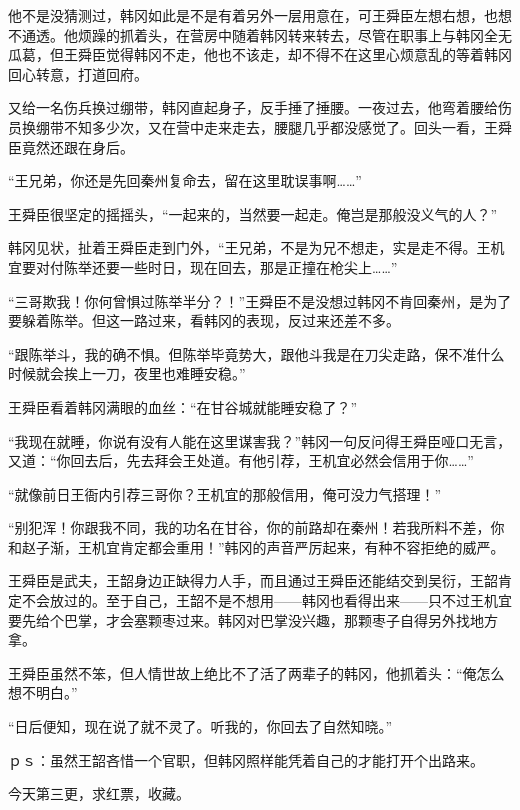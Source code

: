 他不是没猜测过，韩冈如此是不是有着另外一层用意在，可王舜臣左想右想，也想不通透。他烦躁的抓着头，在营房中随着韩冈转来转去，尽管在职事上与韩冈全无瓜葛，但王舜臣觉得韩冈不走，他也不该走，却不得不在这里心烦意乱的等着韩冈回心转意，打道回府。

又给一名伤兵换过绷带，韩冈直起身子，反手捶了捶腰。一夜过去，他弯着腰给伤员换绷带不知多少次，又在营中走来走去，腰腿几乎都没感觉了。回头一看，王舜臣竟然还跟在身后。

“王兄弟，你还是先回秦州复命去，留在这里耽误事啊……”

王舜臣很坚定的摇摇头，“一起来的，当然要一起走。俺岂是那般没义气的人？”

韩冈见状，扯着王舜臣走到门外，“王兄弟，不是为兄不想走，实是走不得。王机宜要对付陈举还要一些时日，现在回去，那是正撞在枪尖上……”

“三哥欺我！你何曾惧过陈举半分？！”王舜臣不是没想过韩冈不肯回秦州，是为了要躲着陈举。但这一路过来，看韩冈的表现，反过来还差不多。

“跟陈举斗，我的确不惧。但陈举毕竟势大，跟他斗我是在刀尖走路，保不准什么时候就会挨上一刀，夜里也难睡安稳。”

王舜臣看着韩冈满眼的血丝：“在甘谷城就能睡安稳了？”

“我现在就睡，你说有没有人能在这里谋害我？”韩冈一句反问得王舜臣哑口无言，又道：“你回去后，先去拜会王处道。有他引荐，王机宜必然会信用于你……”

“就像前日王衙内引荐三哥你？王机宜的那般信用，俺可没力气搭理！”

“别犯浑！你跟我不同，我的功名在甘谷，你的前路却在秦州！若我所料不差，你和赵子渐，王机宜肯定都会重用！”韩冈的声音严厉起来，有种不容拒绝的威严。

王舜臣是武夫，王韶身边正缺得力人手，而且通过王舜臣还能结交到吴衍，王韶肯定不会放过的。至于自己，王韶不是不想用——韩冈也看得出来——只不过王机宜要先给个巴掌，才会塞颗枣过来。韩冈对巴掌没兴趣，那颗枣子自得另外找地方拿。

王舜臣虽然不笨，但人情世故上绝比不了活了两辈子的韩冈，他抓着头：“俺怎么想不明白。”

“日后便知，现在说了就不灵了。听我的，你回去了自然知晓。”

ｐｓ：虽然王韶吝惜一个官职，但韩冈照样能凭着自己的才能打开个出路来。

今天第三更，求红票，收藏。

